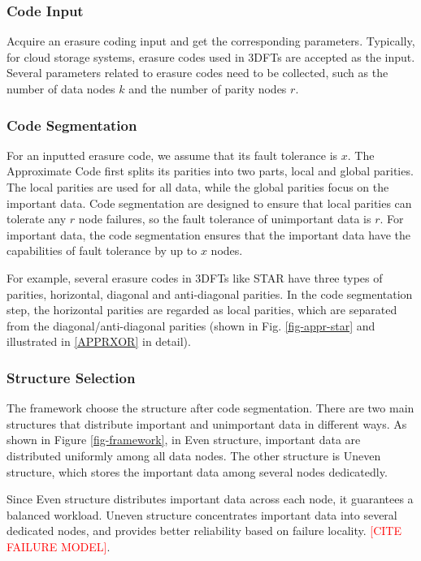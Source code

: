 \documentclass[sigconf]{acmart}
\begin{document}
\subsubsection{Code Input}
Acquire an erasure coding input and get the corresponding parameters. Typically, for cloud storage systems, erasure codes used in 3DFTs are accepted as the input. Several parameters related to erasure codes need to be collected, such as the number of data nodes $k$ and the number of parity nodes $r$.

\subsubsection{Code Segmentation}
For an inputted erasure code, we assume that its fault tolerance is $x$. The Approximate Code first splits its parities into two parts, local and global parities. The local parities are used for all data, while the global parities focus on the important data. Code segmentation are designed to ensure that local parities can tolerate any $r$ node failures, so the fault tolerance of unimportant data is $r$. For important data, the code segmentation ensures that the important data have the capabilities of fault tolerance by up to $x$ nodes.

For example, several erasure codes in 3DFTs like STAR have three types of parities, horizontal, diagonal and anti-diagonal parities. In the code segmentation step, the horizontal parities are regarded as local parities, which are separated from the diagonal/anti-diagonal parities (shown in Fig. \ref{fig-appr-star} and illustrated in \ref{APPRXOR} in detail).

\subsubsection{Structure Selection}
The framework choose the structure after code segmentation.
There are two main structures that distribute important and unimportant data in different ways.
As shown in Figure \ref{fig-framework}, in Even structure, important data are distributed uniformly among all data nodes. The other structure is Uneven structure, which stores the important data among several nodes dedicatedly.

Since Even structure distributes important data across each node, it guarantees a balanced workload. Uneven structure concentrates important data into several dedicated nodes, and provides better reliability based on failure locality. \textcolor{red}{[CITE FAILURE MODEL]}.
\end{document}
